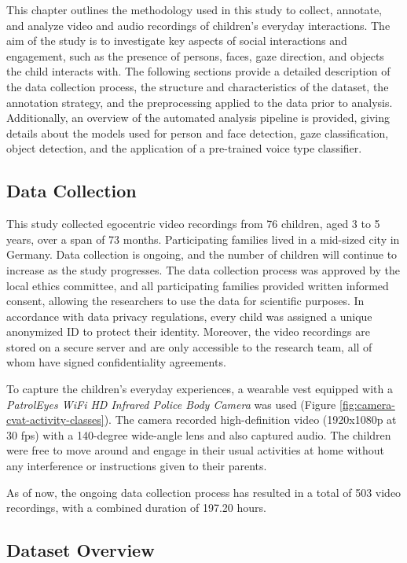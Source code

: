 \documentclass[
  man,floatsintext]{apa6}
\begin{document}
This chapter outlines the methodology used in this study to collect, annotate, and analyze video and audio recordings of children's everyday interactions. The aim of the study is to investigate key aspects of social interactions and engagement, such as the presence of persons, faces, gaze direction, and objects the child interacts with. The following sections provide a detailed description of the data collection process, the structure and characteristics of the dataset, the annotation strategy, and the preprocessing applied to the data prior to analysis. Additionally, an overview of the automated analysis pipeline is provided, giving details about the models used for person and face detection, gaze classification, object detection, and the application of a pre-trained voice type classifier.

\subsection{Data Collection}\label{data-collection}

This study collected egocentric video recordings from 76 children, aged 3 to 5 years, over a span of 73 months. Participating families lived in a mid-sized city in Germany. Data collection is ongoing, and the number of children will continue to increase as the study progresses. The data collection process was approved by the local ethics committee, and all participating families provided written informed consent, allowing the researchers to use the data for scientific purposes. In accordance with data privacy regulations, every child was assigned a unique anonymized ID to protect their identity. Moreover, the video recordings are stored on a secure server and are only accessible to the research team, all of whom have signed confidentiality agreements.

To capture the children's everyday experiences, a wearable vest equipped with a \emph{PatrolEyes WiFi HD Infrared Police Body Camera} was used (Figure \ref{fig:camera-cvat-activity-classes}). The camera recorded high-definition video (1920x1080p at 30 fps) with a 140-degree wide-angle lens and also captured audio. The children were free to move around and engage in their usual activities at home without any interference or instructions given to their parents.

As of now, the ongoing data collection process has resulted in a total of 503 video recordings, with a combined duration of 197.20 hours.

\subsection{Dataset Overview}\label{dataset-overview}
\end{document}
